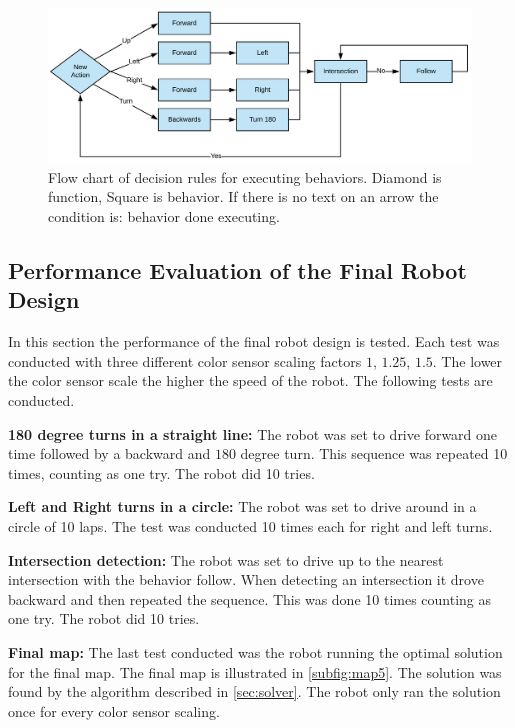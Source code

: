 \documentclass[../report.tex]{subfiles}
\begin{document}
\begin{figure}[H]
    \centering
    \includegraphics[width=1\columnwidth]{figures/robot_design/Decision_rules_behaviors.png}
    \caption{Flow chart of decision rules for executing behaviors. Diamond is function, Square is behavior. If there is no text on an arrow the condition is: behavior done executing.}
    \label{fig:decision_rules}
\end{figure}

\subsection{Performance Evaluation of the Final Robot Design}\label{subsec:robot_eval}
In this section the performance of the final robot design is tested. Each test was conducted with three different color sensor scaling factors $1$, $1.25$, $1.5$. The lower the color sensor scale the higher the speed of the robot. The following tests are conducted.

\textbf{180 degree turns in a straight line:}  
The robot was set to drive forward one time followed by a backward and $180$ degree turn. This sequence was repeated 10 times, counting as one try. The robot did 10 tries. 

\textbf{Left and Right turns in a circle:}
The robot was set to drive around in a circle of 10 laps. The test was conducted 10 times each for right and left turns. 

\textbf{Intersection detection:} 
The robot was set to drive up to the nearest intersection with the behavior follow. When detecting an intersection it drove backward and then repeated the sequence. This was done 10 times counting as one try. The robot did 10 tries. 

\textbf{Final map:}
The last test conducted was the robot running the optimal solution for the final map. The final map is illustrated in \autoref{subfig:map5}. The solution was found by the algorithm described in \autoref{sec:solver}. The robot only ran the solution once for every color sensor scaling.
\end{document}
